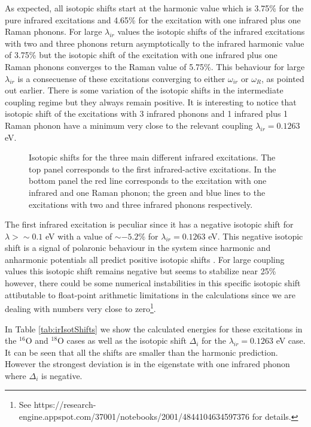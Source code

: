 As expected, all isotopic shifts start at the harmonic value which is 3.75\% for the pure infrared excitations and 4.65\% for the excitation with one infrared plus one Raman phonons.
For large $\lambda_{ir}$ values the isotopic shifts of the infrared excitations with two and three phonons return asymptotically to the infrared harmonic value of 3.75\% but the isotopic shift of the excitation with one infrared plus one Raman phonons converges to the Raman value of 5.75\%.
This behaviour for large $\lambda_{ir}$ is a consecuense of these excitations converging to either $\omega_{ir}$ or $\omega_R$, as pointed out earlier.
There is some variation of the isotopic shifts in the intermediate coupling regime but they always remain positive.
It is interesting to notice that isotopic shift of the excitations with 3 infrared phonons and 1 infrared plus 1 Raman phonon have a minimum very close to the relevant coupling $\lambda_{ir}=0.1263$ eV.
%
\begin{figure}[ht]
  \centering
  
  \caption[Isotopic shifts for the different infrared excitations.]
  {Isotopic shifts for the three main different infrared excitations.
  The top panel corresponds to the first infrared-active excitations.
  In the bottom panel the red line corresponds to the excitation with one infrared and one Raman phonon; the green and blue lines to the excitations with two and three infrared phonons respectively.}
  \label{fig:irIsot}
\end{figure}

The first infrared excitation is peculiar since it has a negative isotopic shift for $\lambda > \sim 0.1$ eV with a value of $\sim -5.2$\% for $\lambda_{ir}=0.1263$ eV.
This negative isotopic shift is a signal of polaronic behaviour in the system since harmonic and anharmonic potentials all predict positive isotopic shifts \cite{MustredeLeon2000,Pali1998}.
For large coupling values this isotopic shift remains negative but seems to stabilize near 25\% however, there could be some numerical instabilities in this specific isotopic shift attibutable to float-point arithmetic limitations in the calculations since we are dealing with numbers very close to zero\footnote{See https://research-engine.appspot.com/37001/notebooks/2001/4844104634597376 for details.}.

In Table \ref{tab:irIsotShifts} we show the calculated energies for these excitations in the $^{16}$O and $^{18}$O cases as well as the isotopic shift $\Delta_i$ for the $\lambda_{ir}=0.1263$ eV case. It can be seen that all the shifts are smaller than the harmonic prediction. However the strongest deviation is in the eigenstate with one infrared phonon where $\Delta_i$ is negative.

